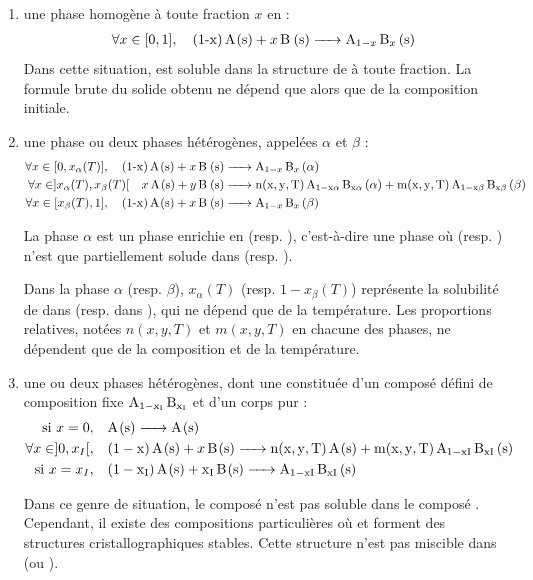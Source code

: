 \documentclass[a4paper]{book}
\begin{document}
\begin{enumerate}
\item  une phase homogène à toute fraction $x$ en  :
\begin{align*}
\forall x \in [0,1], \quad \ce{(1-x) A(s) + x B (s) -> A_{1-x} B_x (s)}
\end{align*}
Dans cette situation,  est soluble dans la structure de  à toute fraction. La formule brute du solide obtenu ne dépend que alors que de la composition initiale.

\item une phase ou deux phases hétérogènes, appelées $\alpha$ et $\beta$ : 
\begin{align*}
\forall x \in [0, x_\alpha (T)], \quad \ce{(1-x) A(s) + x B (s) & -> A_{1-x} B_{x} (\alpha)} \\
\forall x \in ]x_\alpha (T), x_\beta (T)[ \quad \ce{x A(s) + y B (s) & -> n(x,y,T) A_{1-x\alpha} B_{x\alpha} (\alpha) + m(x,y,T) A_{1-x\beta} B_{x\beta} (\beta)} \\
\forall x \in [x_\beta (T), 1], \quad \ce{(1-x) A(s) + x B (s) & -> A_{1-x} B_{x}  (\beta)}
\end{align*}

La phase $\alpha$ est un phase enrichie en  (resp. ), c'est-à-dire une phase où  (resp. ) n'est que partiellement solude dans  (resp. ).

Dans la phase $\alpha$ (resp. $\beta$), $x_\alpha (T)$ (resp. $1 - x_\beta (T)$) représente la solubilité de  dans  (resp.  dans ), qui ne dépend que de la température. Les proportions relatives, notées $n(x,y,T)$ et $m(x,y,T)$ en chacune des phases, ne dépendent que de la composition et de la température.

\item une ou deux phases hétérogènes, dont une constituée d'un composé défini de composition fixe $\ce{A_{1 - x_I} B_{x_I}}$ et d'un corps pur :
\begin{align*}
\text{si } x = 0, \quad &\ce{A(s) -> A(s)} \\
\forall x \in ]0, x_I[, \quad &\ce{(1 - x) A(s) + x B(s) -> n(x,y,T) A(s) + m(x,y,T) A_{1-xI} B_{xI} (s)} \\
\text{si } x = x_I, \quad &\ce{(1 - x_I) A(s) + x_I B(s) -> A_{1-xI} B_{xI} (s)}
\end{align*}

Dans ce genre de situation, le composé  n'est pas soluble dans le composé . Cependant, il existe des compositions particulières où  et  forment des structures cristallographiques stables. Cette structure n'est pas miscible dans  (ou ). 


\end{enumerate}
\end{document}
